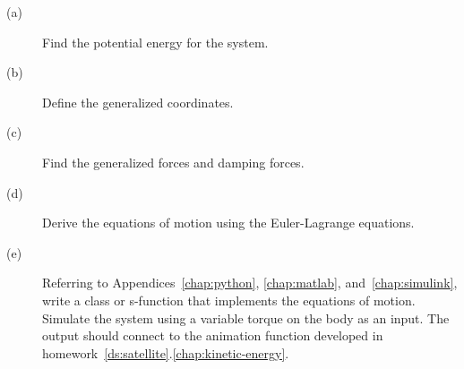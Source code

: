 

\begin{description}\item[]
    \item[(a)] Find the potential energy for the system.
    \item[(b)] Define the generalized coordinates.
    \item[(c)] Find the generalized forces and damping forces.
    \item[(d)] Derive the equations of motion using the Euler-Lagrange equations.
    \item[(e)] Referring to Appendices~\ref{chap:python}, \ref{chap:matlab}, and~\ref{chap:simulink}, write a class or s-function that implements the equations of motion.  Simulate the system using a variable torque on the body as an input.  The output should connect to the animation function developed in homework~\ref{ds:satellite}.\ref{chap:kinetic-energy}.
\end{description}